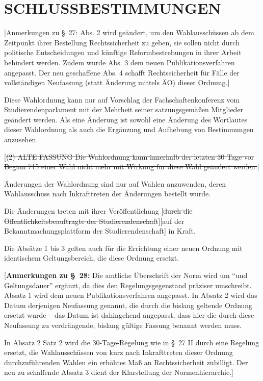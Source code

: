 \documentclass[%
draft,%
multilinesections%
]{fswo}
\newcommand\oldT[1]  {{\color{Gray}[\st{#1}]}}
\newcommand\newT[1]  {{\color{Green}[#1]}}
\newcommand\bemFr[1] {{\color{Red}[#1]}}
\newcommand\oldT[1]{}%
\newcommand\newT[1]{#1}
\newcommand\bemFr[1]{}%
\newcommand\change[2]{\oldT{#1}\newT{#2}}
\begin{document}
\section{SCHLUSSBESTIMMUNGEN}
\bemFr{Anmerkungen zu \S~27: Abs. 2 wird geändert, um den Wahlausschüssen ab dem Zeitpunkt ihrer Bestellung Rechtssicherheit zu geben, sie sollen nicht durch politische Entscheidungen und künftige Reformbestrebungen in ihrer Arbeit behindert werden.
Zudem wurde Abs. 3 dem neuen Publikationsverfahren angepasst. Der neu geschaffene Abs. 4 schafft Rechtssicherheit für Fälle der vollständigen Neufassung (statt Änderung mittels ÄO) dieser Ordnung.}

\begin{contract}
Diese Wahlordnung kann nur auf Vorschlag der Fachschaftenkonferenz vom Studierendenparlament mit der Mehrheit seiner satzungsgemäßen Mitglieder geändert werden.
Als eine Änderung ist sowohl eine Änderung des Wortlautes dieser Wahlordnung als auch die Ergänzung und Aufhebung von Bestimmungen anzusehen.
\begin{addmargin}{0pt}
\oldT{(2) ALTE FASSUNG Die Wahlordnung kann innerhalb der letzten 30 Tage vor Beginn 715 einer Wahl nicht mehr mit Wirkung für diese Wahl geändert werden.}
\end{addmargin}

Änderungen der Wahlordnung sind nur auf Wahlen anzuwenden, deren Wahlausschuss nach Inkrafttreten der Änderungen bestellt wurde.

Die Änderungen treten mit ihrer Veröffentlichung
\change{durch die Öffentlichkeitsbeauftragte der Studierendenschaft}{auf der Bekanntmachungsplattform der Studierendenschaft} in Kraft.

Die Absätze 1 bis 3 gelten auch für die Errichtung einer neuen Ordnung mit identischem Geltungsbereich, die diese Ordnung ersetzt.
\end{contract}

\bemFr{\textbf{Anmerkungen zu \S~28:}
Die amtliche Überschrift der Norm wird um \enquote{und Geltungsdauer} ergänzt, da dies den Regelungsgegenstand präziser umschreibt.
Absatz 1 wird dem neuen Publikationsverfahren angepasst.
In Absatz 2 wird das Datum derjenigen Neufassung genannt, die durch die bislang geltende Ordnung ersetzt wurde –
das Datum ist dahingehend angepasst, dass hier die durch diese Neufassung zu verdrängende, bislang gültige Fassung benannt werden muss.

In Absatz 2 Satz 2 wird die 30-Tage-Regelung wie in \S~27 II durch eine Regelung ersetzt, die Wahlausschüssen von kurz nach Inkrafttreten dieser Ordnung durchzuführenden Wahlen ein erhöhtes Maß an Rechtssicherheit zubilligt. Der neu zu schaffende Absatz 3 dient der Klarstellung der Normenhierarchie.}
\end{document}
